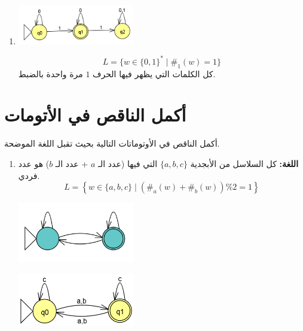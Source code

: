﻿\documentclass[12pt]{article}
\begin{document}
\begin{enumerate}[itemsep=3em]
\begin{enumerate}
\item
\includegraphics[width=0.4\textwidth]{../../../images/DFAs/ex1_q13.png}
\ifwithsols
\begin{boxSolution}
\[ L = \{ w \in \{0, 1\}^* \mid \#_1(w) = 1 \} \]
كل الكلمات التي يظهر فيها الحرف $1$ مرة واحدة بالضبط.
\end{boxSolution}
\fi

\end{enumerate}

\clearpage
\section{أكمل الناقص في الأتومات}
أكمل الناقص في الأوتوماتات التالية بحيث تقبل اللغة الموضحة.

\ifwithsols
\begin{enumerate}[itemsep=3em]
\else
\begin{enumerate}
\fi

\item
\textbf{اللغة:} كل السلاسل من الأبجدية $\{a, b, c\}$ التي فيها (عدد الـ $a$ + عدد الـ $b$) هو عدد فردي.
\[ L = \left\{ w \in \{a, b, c\} \mid (\#_a(w) + \#_b(w)) \% 2 = 1 \right\} \]
\begin{center}
\includegraphics[width=0.4\textwidth]{../../../images/DFAs/ex1_p2_q1.png}
\end{center}
\ifwithsols
\begin{boxSolution}
    \begin{center}
        \includegraphics[width=0.4\textwidth]{../../../images/DFAs/ex1_p2_q1_sol.png}
    \end{center}
\end{boxSolution}
\fi


\end{enumerate}
\end{enumerate}
\end{enumerate}
\end{document}
